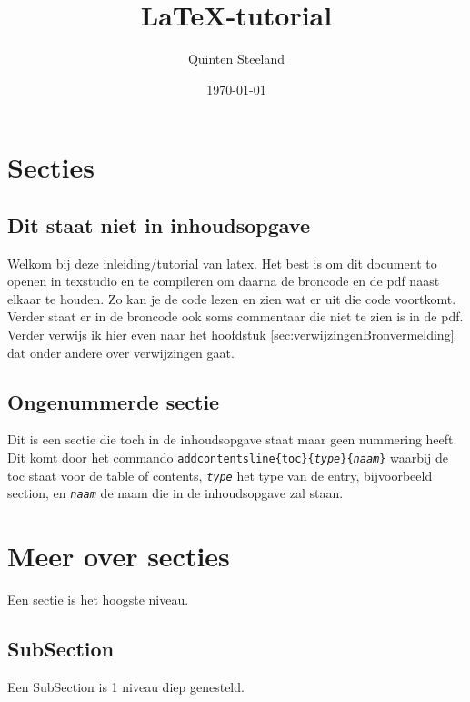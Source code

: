 \documentclass{article} %
\title{\LaTeX-tutorial}
\author{Quinten Steeland}
\date{\today}
\begin{document}
	\maketitle
	
	\newpage
	
	\tableofcontents
	
	\newpage
	
	\section{Secties}
		\subsection*{Dit staat niet in inhoudsopgave}
			Welkom bij deze inleiding/tutorial van latex.
			Het best is om dit document to openen in texstudio en te compileren om daarna de broncode en de pdf naast elkaar te houden. Zo kan je de code lezen en zien wat er uit die code voortkomt. Verder staat er in de broncode ook soms commentaar die niet te zien is in de pdf.
			Verder verwijs ik hier even naar het hoofdstuk \ref{sec:verwijzingenBronvermelding} dat onder andere over verwijzingen gaat.
			
		\subsection*{Ongenummerde sectie}
			Dit is een sectie die toch in de inhoudsopgave staat maar geen nummering heeft.
			Dit komt door het commando \texttt{addcontentsline\{toc\}\{\textit{type}\}\{\textit{naam}\}}
			waarbij de toc staat voor de table of contents,  \texttt{\textit{type}} het type van de entry, bijvoorbeeld section, en  \texttt{\textit{naam}} de naam die in de inhoudsopgave zal staan.
			
	\section{Meer over secties}
		Een sectie is het hoogste niveau.
	
		\subsection{SubSection}
			Een SubSection is 1 niveau diep genesteld.
			
\end{document}
